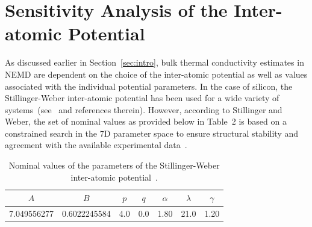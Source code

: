 \section{Sensitivity Analysis of the Inter-atomic Potential}
\label{sec:sense}

As discussed earlier in Section~\ref{sec:intro}, bulk thermal conductivity estimates in NEMD
are dependent on the choice of the inter-atomic potential as well as values associated with
the individual potential parameters. In the case of silicon, the Stillinger-Weber inter-atomic potential
has been used for a wide variety of 
systems~(see~\cite{Laradji:1995,Zhang:2014,Jiang:2015,Watanabe:1999,Zhou:2013} and references therein).
However, according to Stillinger and Weber, the set of nominal
values as provided below in Table~2 is based on a constrained search in the 7D parameter space
to ensure structural stability and agreement with the available experimental data~\cite{Stillinger:1985}.

\begin{table}[htbp]
\begin{center}
\begin{tabular}{|c|c|c|c|c|c|c|}
\hline 
$A$ & $B$ & $p$ & $q$ & $\alpha$ & $\lambda$ & $\gamma$ \\
\hline \hline
7.049556277 & 0.6022245584 & 4.0 & 0.0 & 1.80 & 21.0 & 1.20 \\
\hline
\end{tabular}
\end{center}
\caption{Nominal values of the parameters of the Stillinger-Weber inter-atomic
potential~\cite{Stillinger:1985}.}
\end{table}

